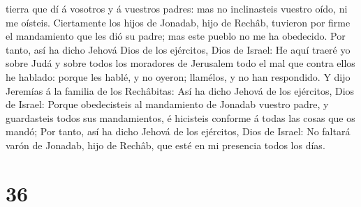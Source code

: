 tierra que dí á vosotros y á vuestros padres: mas no inclinasteis
vuestro oído, ni me oísteis.  Ciertamente los hijos de
Jonadab, hijo de Rechâb, tuvieron por firme el mandamiento que les dió
su padre; mas este pueblo no me ha obedecido.  Por tanto,
así ha dicho Jehová Dios de los ejércitos, Dios de Israel: He aquí
traeré yo sobre Judá y sobre todos los moradores de Jerusalem todo el
mal que contra ellos he hablado: porque les hablé, y no oyeron;
llamélos, y no han respondido.  Y dijo Jeremías á la
familia de los Rechâbitas: Así ha dicho Jehová de los ejércitos, Dios de
Israel: Porque obedecisteis al mandamiento de Jonadab vuestro padre, y
guardasteis todos sus mandamientos, é hicisteis conforme á todas las
cosas que os mandó;  Por tanto, así ha dicho Jehová de
los ejércitos, Dios de Israel: No faltará varón de Jonadab, hijo de
Rechâb, que esté en mi presencia todos los días.

\hypertarget{section-35}{%
\section{36}\label{section-35}}

